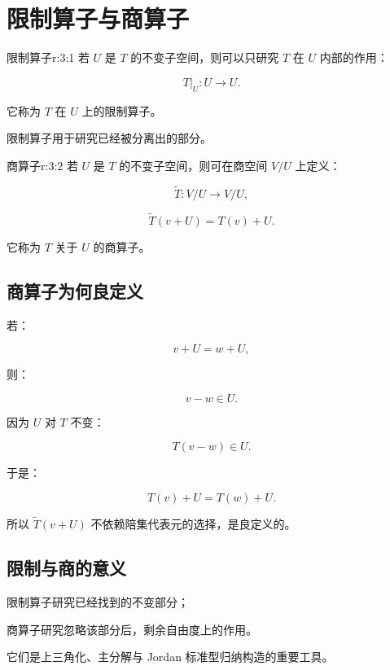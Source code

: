 
\chapter{限制算子与商算子}


\begin{jdefn}{限制算子}{r:3:1}
若 $U$ 是 $T$ 的不变子空间，则可以只研究 $T$ 在 $U$ 内部的作用：

\[
T|_U:U\to U.
\]

它称为 $T$ 在 $U$ 上的限制算子。

限制算子用于研究已经被分离出的部分。
\end{jdefn}

\begin{jdefn}{商算子}{r:3:2}
若 $U$ 是 $T$ 的不变子空间，则可在商空间 $V/U$ 上定义：

\[
\widetilde T:V/U\to V/U,
\]

\[
\widetilde T(v+U)=T(v)+U.
\]

它称为 $T$ 关于 $U$ 的商算子。
\end{jdefn}

\section{商算子为何良定义}

若：

\[
v+U=w+U,
\]

则：

\[
v-w\in U.
\]

因为 $U$ 对 $T$ 不变：

\[
T(v-w)\in U.
\]

于是：

\[
T(v)+U=T(w)+U.
\]

所以 $\widetilde T(v+U)$ 不依赖陪集代表元的选择，是良定义的。

\section{限制与商的意义}

\begin{jitem}
\item %
限制算子研究已经找到的不变部分；
\item %
商算子研究忽略该部分后，剩余自由度上的作用。
\end{jitem}

它们是上三角化、主分解与 Jordan 标准型归纳构造的重要工具。
